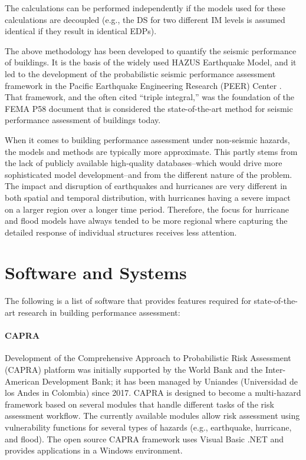 The calculations can be performed independently if the models used for these calculations are decoupled (e.g., the DS for two different IM levels is assumed identical if they result in identical EDPs).

The above methodology has been developed to quantify the seismic performance of buildings. It is the basis of the widely used HAZUS Earthquake Model, and it led to the development of the probabilistic seismic performance assessment framework in the Pacific Earthquake Engineering Research (PEER) Center \citep{porter2001assemblybased}. That framework, and the often cited ``triple integral,'' was the foundation of the FEMA P58 document that is considered the state-of-the-art method for seismic performance assessment of buildings today.

When it comes to building performance assessment under non-seismic hazards, the models and methods are typically more approximate. This partly stems from the lack of publicly available high-quality databases--which would drive more sophisticated model development--and from the different nature of the problem. The impact and disruption of earthquakes and hurricanes are very different in both spatial and temporal distribution, with hurricanes having a severe impact on a larger region over a longer time period. Therefore, the focus for hurricane and flood models have always tended to be more regional where capturing the detailed response of individual structures receives less attention.

\section{Software and Systems}
\label{sec:perf_bldg_tools}

The following is a list of software that provides features required for state-of-the-art research in building performance assessment:

\paragraph{CAPRA} Development of the Comprehensive Approach to Probabilistic Risk Assessment (CAPRA) platform was initially supported by the World Bank and the Inter-American Development Bank; it has been managed by Uniandes (Universidad de los Andes in Colombia) since 2017. CAPRA is designed to become a multi-hazard framework based on several modules that handle different tasks of the risk assessment workflow. The currently available modules allow risk assessment using vulnerability functions for several types of hazards (e.g., earthquake, hurricane, and flood). The open source CAPRA framework uses Visual Basic .NET and provides applications in a Windows environment.

